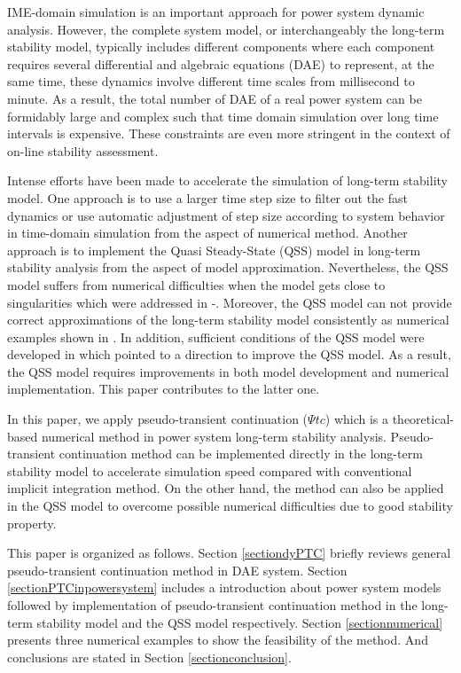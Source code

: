 \documentclass[journal]{IEEEtran}
\begin{document}
IME-domain simulation is an important approach for power system dynamic analysis. However, the complete system model, or interchangeably the long-term stability model, typically includes different components where each component requires several differential and algebraic equations (DAE) to represent, at the same time, these dynamics involve different time scales from millisecond to minute. As a result, the total number of DAE of a real power system can be formidably large and complex such that time domain simulation over long time intervals is expensive\cite{Chiang:book}. These constraints are even more stringent in the context of on-line stability assessment.

Intense efforts have been made to accelerate the simulation of long-term stability model. One approach is to use a larger time step size to filter out the fast dynamics or use automatic adjustment of step size according to system behavior in time-domain simulation \cite{Kundur:book}\cite{Kurita:article}\cite{Cutsem:book} from the aspect of numerical method. Another approach is to implement the Quasi Steady-State (QSS) model in long-term stability analysis \cite{Cutsem:book}\cite{Cutsem:artical} from the aspect of model approximation. Nevertheless, the QSS model suffers from numerical difficulties when the model gets close to singularities which were addressed in \cite{Cutsem:artical2}-\cite{Wang:artical}. Moreover, the QSS model can not provide correct approximations of the long-term stability model consistently as numerical examples shown in \cite{Wangxz:article}\cite{Wangxz:wiley}. In addition, sufficient conditions of the QSS model were developed in \cite{Wangxz:journal} which pointed to a direction to improve the QSS model. As a result, the QSS model requires improvements in both model development and numerical implementation. This paper contributes to the latter one.


In this paper, we apply pseudo-transient continuation ($\Psi tc$) which is a theoretical-based numerical method in power system long-term stability analysis. Pseudo-transient continuation method can be implemented directly in the long-term stability model to accelerate simulation speed compared with conventional implicit integration method. On the other hand, the method can also be applied in the QSS model to overcome possible numerical difficulties due to good stability property.

This paper is organized as follows. Section \ref{sectiondyPTC} briefly reviews general pseudo-transient continuation method in DAE system. Section \ref{sectionPTCinpowersystem} includes a introduction about power system models followed by implementation of pseudo-transient continuation method in the long-term stability model and the QSS model respectively. Section \ref{sectionnumerical} presents three numerical examples to show the feasibility of the method. And conclusions are stated in Section \ref{sectionconclusion}. 
\end{document}
